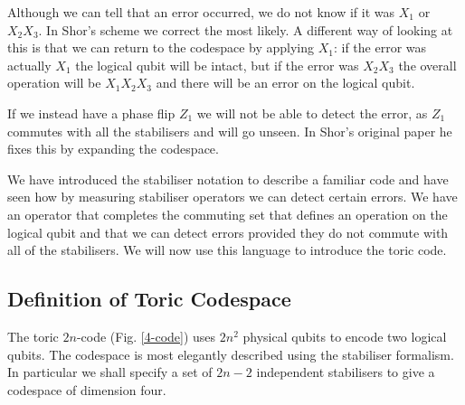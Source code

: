 Although we can tell that an error occurred, we do not know if it was $X_1$ or $X_2X_3$. In Shor's scheme we correct the most likely. A different way of looking at this is that we can return to the codespace by applying $X_1$: if the error was actually $X_1$ the logical qubit will be intact, but if the error was $X_2X_3$ the overall operation will be $X_1X_2X_3$ and there will be an error on the logical qubit.

If we instead have a phase flip $Z_1$ we will not be able to detect the error, as $Z_1$ commutes with all the stabilisers and will go unseen. In Shor's original paper he fixes this by expanding the codespace.

We have introduced the stabiliser notation to describe a familiar code and have seen how by measuring stabiliser operators we can detect certain errors. We have an operator that completes the commuting set that defines an operation on the logical qubit and that we can detect errors provided they do not commute with all of the stabilisers. We will now use this language to introduce the toric code.

\subsection{Definition of Toric Codespace}

The toric $2n$-code (Fig. \ref{4-code}) uses $2n^2$ physical qubits to encode two logical qubits. The codespace is most elegantly described using the stabiliser formalism. In particular we shall specify a set of $2n - 2$ independent stabilisers to give a codespace of dimension four.

